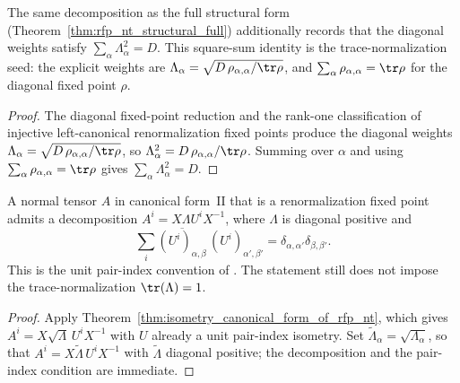 \begin{theorem}%
    \label{thm:rfp_nt_structural_full_sq_sum}
    \leanok
    The same decomposition as the full structural form
    (Theorem~\ref{thm:rfp_nt_structural_full}) additionally records that the
    diagonal weights satisfy $\sum_\alpha \Lambda_\alpha^2 = D$.  This square-sum
    identity is the trace-normalization seed: the explicit weights are
    $\Lambda_\alpha = \sqrt{D\,\rho_{\alpha,\alpha}/\tr\rho}$, and
    $\sum_\alpha \rho_{\alpha,\alpha} = \tr\rho$ for the diagonal fixed point
    $\rho$.
\end{theorem}
\begin{proof}\leanok
    The diagonal fixed-point reduction and the rank-one classification of
    injective left-canonical renormalization fixed points produce the diagonal
    weights $\Lambda_\alpha = \sqrt{D\,\rho_{\alpha,\alpha}/\tr\rho}$, so
    $\Lambda_\alpha^2 = D\,\rho_{\alpha,\alpha}/\tr\rho$.  Summing over $\alpha$
    and using $\sum_\alpha \rho_{\alpha,\alpha} = \tr\rho$ gives
    $\sum_\alpha \Lambda_\alpha^2 = D$.
\end{proof}

\begin{theorem}%
    \label{thm:rfp_nt_structural_full_unit_pair}
    \leanok
    A normal tensor $A$ in canonical form~II that is a renormalization fixed
    point admits a decomposition $A^i = X \Lambda U^i X^{-1}$, where
    $\Lambda$ is diagonal positive and
    \[
        \sum_i \overline{(U^i)_{\alpha,\beta}}\,
        (U^i)_{\alpha',\beta'}
        =
        \delta_{\alpha,\alpha'}\delta_{\beta,\beta'} .
    \]
    This is the unit pair-index convention of
    \cite[Section~3]{Cirac2016MPDO_arXiv}.  The statement still does not impose
    the trace-normalization $\tr(\Lambda)=1$.
\end{theorem}
\begin{proof}\leanok
    Apply Theorem~\ref{thm:isometry_canonical_form_of_rfp_nt}, which gives
    $A^i = X\sqrt{\Lambda}\,U^i X^{-1}$ with $U$ already a unit pair-index
    isometry.  Set $\widetilde\Lambda_\alpha = \sqrt{\Lambda_\alpha}$, so that
    $A^i = X\widetilde\Lambda\,U^i X^{-1}$ with $\widetilde\Lambda$ diagonal
    positive; the decomposition and the pair-index condition are immediate.
\end{proof}

